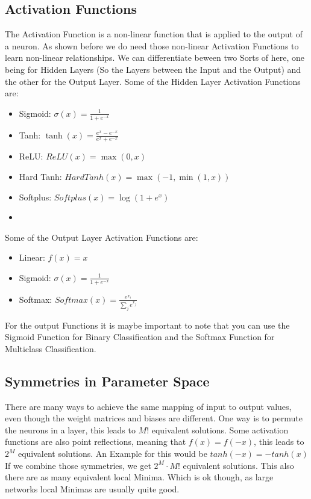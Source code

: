 \documentclass[a4paper]{article}
\begin{document}
\subsection{Activation Functions}
The Activation Function is a non-linear function that is applied to the output of a neuron. As shown before we do need those non-linear Activation Functions to learn non-linear relationships. We can differentiate beween two Sorts of here, one being for Hidden Layers (So the Layers between the Input and the Output) 
and the other for the Output Layer. Some of the Hidden Layer Activation Functions are:
\begin{itemize}
    \item Sigmoid: $\sigma(x) = \frac{1}{1 + e^{-x}}$
    \item Tanh: $\tanh(x) = \frac{e^{x} - e^{-x}}{e^{x} + e^{-x}}$
    \item ReLU: $ReLU(x) = \max(0,x)$
    \item Hard Tanh: $HardTanh(x) = \max(-1, \min(1,x))$
    \item Softplus: $Softplus(x) = \log(1 + e^{x})$
    \item 
\end{itemize}
Some of the Output Layer Activation Functions are:
\begin{itemize}
    \item Linear: $f(x) = x$
    \item Sigmoid: $\sigma(x) = \frac{1}{1 + e^{-x}}$
    \item Softmax: $Softmax(x) = \frac{e^{x_{i}}}{\sum_{j} e^{x_{j}}}$
\end{itemize}
For the output Functions it is maybe important to note that you can use the Sigmoid Function for Binary Classification and the Softmax Function for Multiclass Classification. 

\subsection{Symmetries in Parameter Space}
There are many ways to achieve the same mapping of input to output values, even though the weight matrices and biases are different. One way is to permute the neurons in a layer, this leads to $M!$ equivalent solutions. Some activation functions are also point reflections, meaning that $f(x) = f(-x)$, this leads to $2^{M}$ equivalent solutions. 
An Example for this would be $tanh(-x) = -tanh(x)$ If we combine those symmetries, we get $2^{M} \cdot M!$ equivalent solutions. This also there are as many equivalent local Minima. Which is ok though, as large networks local Minimas are usually quite good. 
\end{document}
